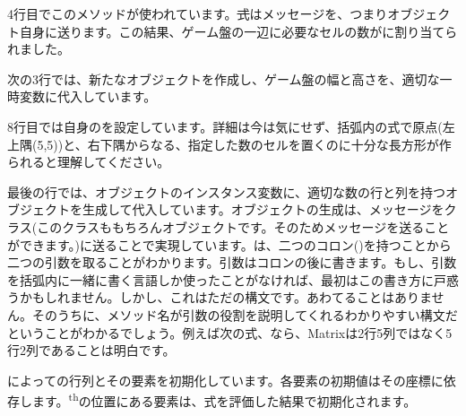 \documentclass[a4paper,10pt,twoside]{book}
\begin{document}
4行目でこのメソッドが使われています。\st 式はメッセージを、つまりオブジェクト自身に送ります。この結果、ゲーム盤の一辺に必要なセルの数がに割り当てられました。

次の3行では、新たなオブジェクトを作成し、ゲーム盤の幅と高さを、適切な一時変数に代入しています。

8行目では自身のを設定しています。詳細は今は気にせず、括弧内の式で原点(\ie 左上隅(5,5))と、右下隅からなる、指定した数のセルを置くのに十分な長方形が作られると理解してください。

最後の行では、オブジェクトのインスタンス変数に、適切な数の行と列を持つオブジェクトを生成して代入しています。オブジェクトの生成は、メッセージをクラス(このクラスももちろんオブジェクトです。そのためメッセージを送ることができます。)に送ることで実現しています。は、二つのコロン(\ct{:})を持つことから二つの引数を取ることがわかります。引数はコロンの後に書きます。もし、引数を括弧内に一緒に書く言語しか使ったことがなければ、最初はこの書き方に戸惑うかもしれません。しかし、これはただの構文です。あわてることはありません。そのうちに、メソッド名が引数の役割を説明してくれるわかりやすい構文だということがわかるでしょう。例えば次の式、なら、Matrixは2行5列ではなく5行2列であることは明白です。


によっての行列とその要素を初期化しています。各要素の初期値はその座標に依存します。\textsuperscript{th}の位置にある要素は、式を評価した結果で初期化されます。



\end{document}

